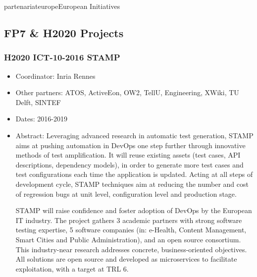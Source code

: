 \documentclass{ra2018}
\begin{document}
\begin{module}{partenariat}{europe}{European Initiatives}

\subsection{FP7 \& H2020 Projects}

\subsubsection*{\label{project:stamp} H2020 ICT-10-2016 STAMP}
\begin{itemize}
	\item Coordinator: Inria Rennes
	\item Other partners: ATOS, ActiveEon, OW2, TellU, Engineering, XWiki, TU Delft, SINTEF
	\item Dates: 2016-2019
	\item Abstract: Leveraging advanced research in automatic test generation, STAMP aims at pushing automation in DevOps one step further through innovative methods of test amplification. It will reuse existing assets (test cases, API descriptions, dependency models), in order to generate more test cases and test configurations each time the application is updated. Acting at all steps of development cycle, STAMP techniques aim at reducing the number and cost of regression bugs at unit level, configuration level and production stage.
	
	STAMP will raise confidence and foster adoption of DevOps by the European IT industry. The project gathers 3 academic partners with strong software testing expertise, 5 software companies (in: e-Health, Content Management, Smart Cities and Public Administration), and an open source consortium. This industry-near research addresses concrete, business-oriented objectives. All solutions are open source and developed as microservices to facilitate exploitation, with a target at TRL 6.  
\end{itemize}
%





\end{module}
\end{document}
